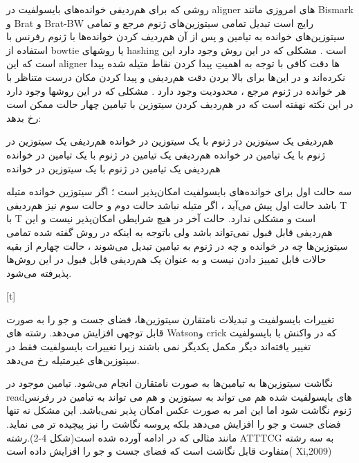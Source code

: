 

روشی که برای هم‌ردیفی خوانده‌های بایسولفیت در aligner های امروزی مانند Bismark و Brat و Brat-BW رایج است تبدیل تمامی سیتوزین‌های ژنوم مرجع و تمامی سیتوزین‌های خوانده به تیامین و پس از آن هم‌ردیف کردن خوانده‌ها با ژنوم رفرنس با استفاده از bowtie یا روشهای hashing است . مشکلی که در این روش وجود دارد این است که این aligner ها دقت کافی با توجه به اهمیتِ پیدا کردن نقاط متیله شده پیدا نکرده‌اند و در این‌ها برای بالا بردن دقت هم‌ردیفی و پیدا کردن مکان درست متناظر با هر خوانده در ژنوم مرجع ، محدودیت وجود  دارد . مشکلی که در این روشها وجود دارد در این نکته نهفته است که در هم‌ردیف کردن سیتوزین با تیامین چهار حالت ممکن است رخ بدهد:

 هم‌ردیفی یک سیتوزین در ژنوم با یک سیتوزین در خوانده 
 هم‌ردیفی یک سیتوزین در ژنوم با یک تیامین در خوانده 
 هم‌ردیفی یک تیامین در ژنوم با یک تیامین در خوانده 
 هم‌ردیفی یک تیامین در ژنوم با یک سیتوزین در خوانده 

سه حالت اول برای خوانده‌های بایسولفیت امکان‌پذیر است ؛ اگر سیتوزین خوانده متیله باشد حالت اول پیش می‌آید ، اگر متیله نباشد حالت دوم و حالت سوم نیز هم‌ردیفی T با T است و مشکلی ندارد. حالت آخر در هیچ شرایطی امکان‌پذیر نیست و این هم‌ردیفی قابل قبول نمی‌تواند باشد ولی  باتوجه به اینکه در روش گفته شده تمامی سیتوزین‌ها چه در خوانده و چه در ژنوم به تیامین تبدیل می‌شوند ، حالت چهارم از بقیه حالات قابل تمییز دادن نیست و به عنوان یک هم‌ردیفی قابل قبول در این روش‌ها پذیرفته می‌شود.


[t]


تغییرات بایسولفیت و تبدیلات نامتقارن سیتوزین‌ها، فضای جست و جو را به صورت قابل توجهی افزایش می‌دهد. رشته های Watsonو crick  که در واکنش با بایسولفیت تغییر یافته‌اند دیگر مکمل یکدیگر نمی باشند زیرا تغییرات بایسولفیت فقط در سیتوزین‌های غیرمتیله رخ می‌دهد.

نگاشت سیتوزین‌ها به تیامین‌ها به صورت نامتقارن انجام می‌شود. تیامین موجود در readهای بایسولفیت شده هم می تواند به سیتوزین و هم می تواند به تیامین در رفرنس ژنوم نگاشت شود  اما این امر به صورت عکس امکان پذیر نمی‌باشد. این مشکل نه تنها فضای جست و جو را افزایش می‌دهد بلکه پروسه نگاشت را نیز پیچیده تر می نماید. مانند مثالی که در ادامه آورده شده است(شکل 4-2).رشته ATTTCG به سه رشته متفاوت قابل نگاشت است که فضای جست و جو را افزایش داده است( Xi,2009)

